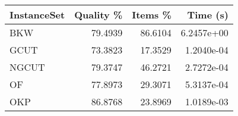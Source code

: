 \begin{tabular}{lrrr}
\hline
InstanceSet & Quality \% & Items \% & Time (s)   \\
\hline
BKW         & 79.4939    & 86.6104  & 6.2457e+00 \\
GCUT        & 73.3823    & 17.3529  & 1.2040e-04 \\
NGCUT       & 79.3747    & 46.2721  & 2.7272e-04 \\
OF          & 77.8973    & 29.3071  & 5.3137e-04 \\
OKP         & 86.8768    & 23.8969  & 1.0189e-03 \\
\hline
\end{tabular}